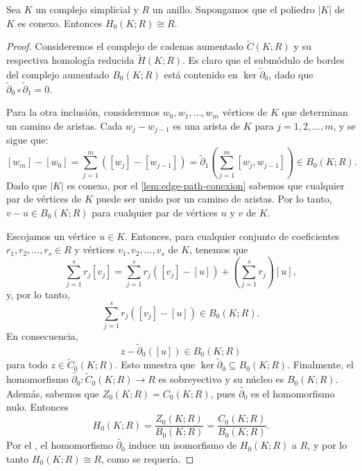 \begin{teorema}
	\label{teo:comp-conex-iso-R}
	Sea \( K \) un complejo simplicial y \( R \) un anillo. Supongamos que el poliedro \( |K| \) de \( K \) es conexo. Entonces \( H_0(K; R) \cong R \).
\end{teorema}
\begin{proof}
	Consideremos el complejo de cadenas aumentado \( \widetilde{C}(K; R) \) y su respectiva homología reducida \( \widetilde{H}(K; R) \). Es claro que el submódulo de bordes del complejo aumentado \( B_0(K; R) \) está contenido en \( \ker \widetilde{\partial}_0 \), dado que \( \widetilde{\partial}_0 \circ \widetilde{\partial}_1 = 0 \).
	
	Para la otra inclusión, consideremos \( w_0, w_1, \ldots, w_m \) vértices de \( K \) que determinan un camino de aristas. Cada \( w_j - w_{j-1} \) es una arista de \( K \) para \( j = 1, 2, \ldots, m \), y se sigue que:
	\[
	[w_m] - [w_0] = \sum_{j=1}^m ([w_j] - [w_{j-1}]) = \widetilde{\partial}_1 \left( \sum_{j=1}^m [w_j, w_{j-1}] \right) \in B_0(K; R).
	\]
	Dado que \( |K| \) es conexo, por el \autoref{lem:edge-path-conexion} sabemos que cualquier par de vértices de \( K \) puede ser unido por un camino de aristas. Por lo tanto, \( v - u \in B_0(K; R) \) para cualquier par de vértices \( u \) y \( v \) de \( K \).
	
	Escojamos un vértice \( u \in K \). Entonces, para cualquier conjunto de coeficientes \( r_1, r_2, \ldots, r_s \in R \) y vértices \( v_1, v_2, \ldots, v_s \) de \( K \), tenemos que
	\[
	\sum_{j=1}^s r_j[v_j] = \sum_{j=1}^s r_j([v_j] - [u]) + \left( \sum_{j=1}^s r_j \right) [u],
	\]
	y, por lo tanto,
	\[
	\sum_{j=1}^s r_j([v_j] - [u]) \in B_0(K; R).
	\]
	En consecuencia,
	\[
	z - \widetilde{\partial}_0([u]) \in B_0(K; R)
	\]
	para todo \( z \in \widetilde{C}_0(K; R) \). Esto muestra que \( \ker \widetilde{\partial}_0 \subseteq B_0(K; R) \).
	Finalmente, el homomorfismo \( \widetilde{\partial_0} : \widetilde{C}_0(K; R) \rightarrow R \) es sobreyectivo y su núcleo es \( B_0(K; R) \). Además, sabemos que \(Z_0(K; R) = C_0(K; R)\), pues \( \widetilde{\partial_0} \) es el homomorfismo nulo. Entonces
	\[
	H_0(K; R) =\frac{ Z_0(K; R)}{B_0(K; R)} = \frac{C_0(K; R)}{B_0(K; R)}.
	\]
	Por el , el homomorfismo \( \widetilde{\partial_0} \) induce un isomorfismo de \( H_0(K; R) \) a \( R \), y por lo tanto \( H_0(K; R) \cong R \), como se requería.
\end{proof}

